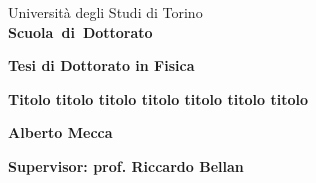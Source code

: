 \begin{titlepage}

\begin{center}
\begin{large}
Universit\`a degli Studi di Torino \\
{\bf Scuola~di~Dottorato}
\end{large}
\end{center}
\hrulefill


\begin{center}
\begin{large}
{\bf Tesi di Dottorato in Fisica}
\end{large}
\end{center}

\vspace{2cm}
\Large{\bf Titolo titolo titolo titolo titolo titolo titolo}

\vspace{8cm}
\large{\bf Alberto Mecca}

\vspace{1cm}
\large{\bf Supervisor: prof. Riccardo Bellan}

\end{titlepage}
